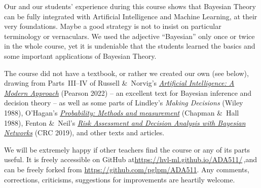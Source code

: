 Our and our students' experience during this course shows that Bayesian Theory can be fully integrated with Artificial Intelligence and Machine Learning, at their very foundations. Maybe a good strategy is not to insist on particular terminology or vernaculars. We used the adjective ``Bayesian'' only once or twice in the whole course, yet it is undeniable that the students learned the basics and some important applications of Bayesian Theory.

The course did not have a textbook, or rather we created our own (see below), drawing from Parts~III--IV of Russell \&\ Norvig's \href{http://aima.cs.berkeley.edu/global-index.html}{\emph{Artificial Intelligence: A Modern Approach}} (Pearson 2022) -- an excellent text for Bayesian inference and decision theory -- as well as some parts of Lindley's \emph{Making Decisions} (Wiley 1988), O'Hagan's \href{https://doi.org/10.1007/978-94-009-1211-3}{\emph{Probability: Methods and measurement}} (Chapman \&\ Hall 1988), Fenton \&\ Neil's \href{https://doi.org/10.1201/b21982}{\emph{Risk Assessment and Decision Analysis with Bayesian Networks}} (CRC 2019), and other texts and articles.

\smallskip


We will be extremely happy if other teachers find the course or any of its parts useful. It is freely accessible on GitHub at\enspace \url{https://hvl-ml.github.io/ADA511/}\,,\enspace and can be freely forked from \url{https://github.com/pglpm/ADA511}. Any comments, corrections, criticisms, suggestions for improvements are heartily welcome.

